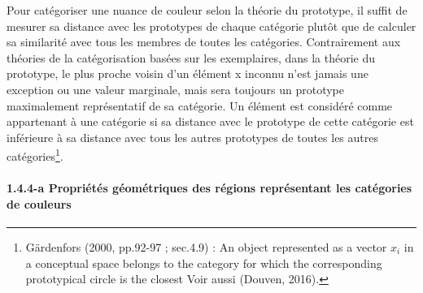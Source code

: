 \documentclass{article}
\begin{document}
Pour catégoriser une nuance de couleur selon la théorie du prototype, il suffit de mesurer sa distance avec les prototypes de chaque catégorie plutôt que de calculer sa similarité avec tous les membres de toutes les catégories. Contrairement aux théories de la catégorisation basées sur les exemplaires, dans la théorie du prototype, le plus proche voisin d’un élément x inconnu n’est jamais une exception ou une valeur marginale, mais sera toujours un prototype maximalement représentatif de sa catégorie. Un élément est considéré comme appartenant à une catégorie si sa distance avec le prototype de cette catégorie est inférieure à sa distance avec tous les autres prototypes de toutes les autres catégories\footnote{Gärdenfors (2000, pp.92-97 ; sec.4.9) : \og An object represented as a vector $x_i$ in a conceptual space belongs to the category for which the corresponding prototypical circle is the closest \fg Voir aussi (Douven, 2016).}. 

\paragraph{1.4.4-a Propriétés géométriques des régions représentant les catégories de couleurs}\mbox{}
\end{document}
